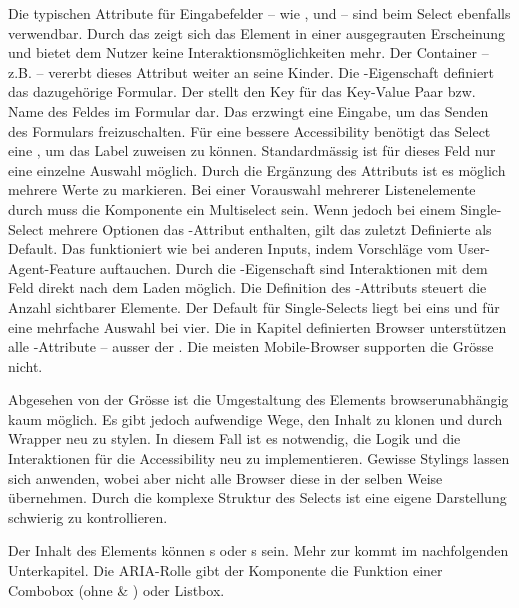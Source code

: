 Die typischen Attribute für Eingabefelder – wie ,  und  – sind beim Select ebenfalls verwendbar. 
Durch das  zeigt sich das Element in einer ausgegrauten Erscheinung und bietet dem Nutzer keine Interaktionsmöglichkeiten mehr. 
Der Container – z.B.  – vererbt dieses Attribut weiter an seine Kinder. 
Die -Eigenschaft definiert das dazugehörige Formular. 
Der  stellt den Key für das Key-Value Paar bzw. Name des Feldes im Formular dar. 
Das  erzwingt eine Eingabe, um das Senden des Formulars freizuschalten. 
Für eine bessere Accessibility benötigt das Select eine , um das Label zuweisen zu können. 
Standardmässig ist für dieses Feld nur eine einzelne Auswahl möglich. 
Durch die Ergänzung des Attributs  ist es möglich mehrere Werte zu markieren. 
Bei einer Vorauswahl mehrerer Listenelemente durch  muss die Komponente ein Multiselect sein. 
Wenn jedoch bei einem Single-Select mehrere Optionen das -Attribut enthalten, gilt das zuletzt Definierte als Default.
Das  funktioniert wie bei anderen Inputs, indem Vorschläge vom User-Agent-Feature auftauchen. 
Durch die -Eigenschaft sind Interaktionen mit dem Feld direkt nach dem Laden möglich. 
Die Definition des -Attributs steuert die Anzahl sichtbarer Elemente. 
Der Default für Single-Selects liegt bei eins und für eine mehrfache Auswahl bei vier. 
Die in Kapitel \textbf{} definierten Browser unterstützen alle -Attribute – ausser der .
Die meisten Mobile-Browser supporten die Grösse nicht. 

Abgesehen von der Grösse ist die Umgestaltung des Elements browserunabhängig kaum möglich. 
Es gibt jedoch aufwendige Wege, den Inhalt zu klonen und durch Wrapper neu zu stylen. 
In diesem Fall ist es notwendig, die Logik und die Interaktionen für die Accessibility neu zu implementieren. 
Gewisse Stylings lassen sich anwenden, wobei aber nicht alle Browser diese in der selben Weise übernehmen. 
Durch die komplexe Struktur des Selects ist eine eigene Darstellung schwierig zu kontrollieren. 

Der Inhalt des Elements können s oder s sein. 
Mehr zur  kommt im nachfolgenden Unterkapitel. 
Die ARIA-Rolle gibt der Komponente die Funktion einer Combobox (ohne  \& ) oder Listbox. 


